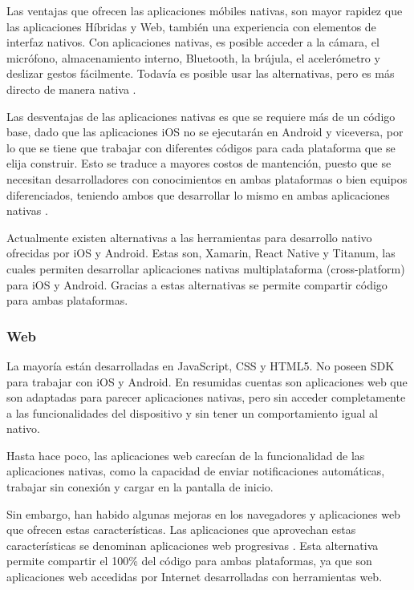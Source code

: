 	Las ventajas que ofrecen las aplicaciones móbiles nativas, son mayor rapidez que las aplicaciones Híbridas y Web, también una experiencia con elementos de interfaz nativos. Con aplicaciones nativas, es posible acceder a la cámara, el micrófono, almacenamiento interno, Bluetooth, la brújula, el acelerómetro y deslizar gestos fácilmente. Todavía es posible usar las alternativas, pero es más directo de manera nativa \citep{mobile-apps-types}.
	
	Las desventajas de las aplicaciones nativas es que se requiere más de un código base, dado que las aplicaciones iOS no se ejecutarán en Android y viceversa, por lo que se tiene que trabajar con diferentes códigos para cada plataforma que se elija construir. Esto se traduce a mayores costos de mantención, puesto que se  necesitan desarrolladores con conocimientos en ambas plataformas o bien equipos diferenciados, teniendo ambos que desarrollar lo mismo en ambas aplicaciones nativas \citep{mobile-apps-types}.

Actualmente existen alternativas a las herramientas para desarrollo nativo ofrecidas por iOS y Android. Estas son, Xamarin, React Native y Titanum, las cuales permiten desarrollar aplicaciones nativas multiplataforma (cross-platform) para iOS y Android. Gracias a estas alternativas se permite compartir código para ambas plataformas. 
	
	\subsubsection{Web}
	La mayoría están desarrolladas en JavaScript, CSS y HTML5. No poseen SDK para trabajar con iOS y Android. En resumidas cuentas son aplicaciones web que son adaptadas para parecer aplicaciones nativas, pero sin acceder completamente a las funcionalidades del dispositivo y sin tener un comportamiento igual al nativo. 
	
	Hasta hace poco, las aplicaciones web carecían de la funcionalidad de las aplicaciones nativas, como la capacidad de enviar notificaciones automáticas, trabajar sin conexión y cargar en la pantalla de inicio.

Sin embargo, han habido algunas mejoras en los navegadores y aplicaciones web que ofrecen estas características. Las aplicaciones que aprovechan estas características se denominan aplicaciones web progresivas \citep{mobile-apps-types}. Esta alternativa permite compartir el 100\% del código para ambas plataformas, ya que son aplicaciones web accedidas por Internet desarrolladas con herramientas web.
	
